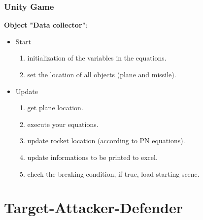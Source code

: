 \documentclass{beamer}
\begin{document}
\begin{frame}
\frametitle{Unity Game}
\textbf{Object "Data collector"}:
\begin{itemize}
\item Start
\begin{enumerate}
	\item initialization of the variables in the equations.
	\item set the location of all objects (plane and missile).
\end{enumerate}
\item Update 
\begin{enumerate}
	\item get plane location.
	\item execute your equations.
	\item update rocket location (according to PN equations).
	\item update informations to be printed to excel.
	\item check the breaking condition, if true, load starting scene.
\end{enumerate}
\end{itemize}
\end{frame}

\section{Target-Attacker-Defender}

\end{document}
